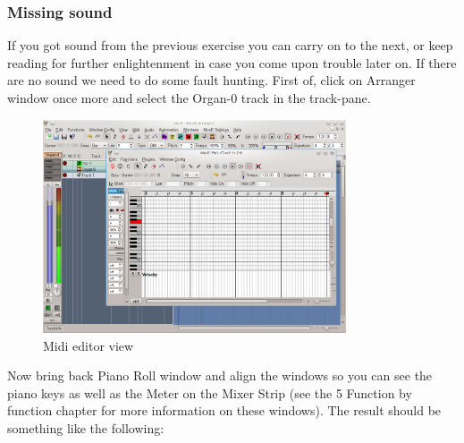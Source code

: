 \documentclass[a4paper]{report}
\newcommand{\screenshotwidth}[0]{0.8\textwidth}
\begin{document}
\subsubsection {Missing sound}
If you got sound from the previous exercise you can carry on to the next,
or keep reading for further enlightenment in case you come upon trouble
later on. If there are no sound we need to do some fault hunting. First
of, click on Arranger window once more and select the Organ-0 track in the
track-pane.
\begin{figure}[ht]
\centering
\includegraphics[width=\screenshotwidth]{pics/main_window_with_midi_editor}
\caption{Midi editor view}
\label{fig:Midi editor}
\end{figure}
Now bring back Piano Roll window and align the windows so you
can see the piano keys as well as the Meter on the Mixer Strip (see the
5 Function by function chapter for more information on these windows).
The result should be something like the following:
\end{document}
